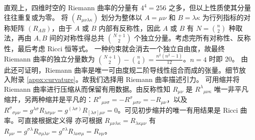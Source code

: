 直观上，四维时空的 Riemann 曲率的分量有 $4^4=256$ 之多，但以上性质使其分量往往重复或为零。
将 $(R_{\mu\nu\lambda\kappa})$ 划分为整体以 $A=\mu\nu$ 和 $B=\lambda\kappa$ 为行列指标的对称矩阵 $(R_{AB})$，由于 $A$ 或 $B$ 内部有反称性，因此 $A$ 或 $B$ 有 $N=\binom{n}{2}$ 种取法，再由 $A,B$ 间的对称性得总共 $\binom{N+1}{2}$ 个独立分量。考虑完所有对称性、反称性，最后考虑 Ricci 恒等式。
一种约束就会消去一个独立自由度，故最终 Riemann 曲率的独立分量数为 $\binom{N+1}{2}-\binom{n}{4}=\frac{n^2(n^2-1)}{12}$。$n=4$ 时即 20。
由此还可证明，Riemann 曲率是唯一可由度规二阶导线性组合而成的张量。细节放入附录 \ref{appx:curvature}。故我们选择用 Riemann 曲率描述引力。
可用缩并将 Riemann 曲率进行压缩从而保留有用数据。由反称性知
$R_{\mu\nu}$ 是 ${R^\lambda}_{\mu\nu\kappa}$ 唯一非平凡缩并，另两种缩并是平凡的：$R^\sigma{}_{\mu\nu\sigma}=-R^\sigma{}_{\mu\sigma\nu}=-R_{\mu\nu}$，以及 $R^\sigma{}_{\sigma\mu\nu}=g^{\lambda\sigma}R_{\lambda\sigma\mu\nu}=g^{(\lambda\sigma)}R_{[\lambda\sigma]\mu\nu}=0$。可见初步缩并的唯一有用结果是 Ricci 曲率。可直接根据定义得
亦可根据 $R_{\mu\nu\lambda\kappa}=R_{\lambda\kappa\mu\nu}$ 有 $R_{\mu\nu}=g^{\sigma\lambda}R_{\sigma\mu\lambda\nu}=g^{\sigma\lambda}R_{\lambda\nu\sigma\mu}=R_{\nu\mu}$。

